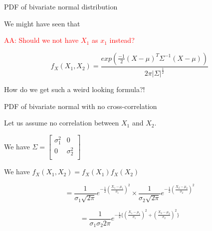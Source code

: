 \documentclass{beamer}
\begin{document}
\begin{frame}{PDF of bivariate normal distribution}

We might have seen that 

\textcolor{red}{AA: Should we not have $X_1$ as $x_1$ instead?}

$$f_X(X_1, X_2) = \frac{exp(\frac{-1}{2}(X-\mu)^T \Sigma^{-1}(X-\mu))}{2\pi |\Sigma|^\frac{1}{2}}$$

How do we get such a weird looking formula?!

\end{frame}

\begin{frame}{PDF of bivariate normal with no cross-correlation}

Let us assume no correlation between $X_1$ and $X_2$.

We have $\Sigma = \begin{bmatrix}
\sigma_1^2 & 0 \\
0 & \sigma_2^2 \\
\end{bmatrix}$

We have $f_X(X_1, X_2) = f_X(X_1)f_X(X_2)$

$$=\frac{1}{\sigma_1 \sqrt{2\pi} } e^{-\frac{1}{2}\left(\frac{X_1-\mu_1}{\sigma_1}\right)^2} \times \frac{1}{\sigma_2 \sqrt{2\pi} } e^{-\frac{1}{2}\left(\frac{X_2-\mu_2}{\sigma_2}\right)^2}$$

$$= \frac{1}{\sigma_1 \sigma_2 2\pi } e^{-\frac{1}{2}\{\left(\frac{X_1-\mu_1}{\sigma_1}\right)^2 + \left(\frac{X_2-\mu_2}{\sigma_2}\right)^2 \}}  $$



\end{frame}
\end{document}
